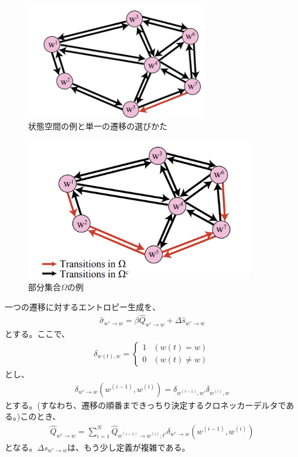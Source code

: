 \documentclass[a4paper,11pt]{jsarticle}
\numberwithin{equation}{section}
\begin{document}
\begin{figure}[H]
    \begin{center}
    \includegraphics[width=80mm]{partial1.png}
    \end{center}
    \caption{状態空間の例と単一の遷移の選びかた}
    \label{fig:状態空間の例と単一の遷移の選びかた}
\end{figure}

\begin{figure}[H]
    \begin{center}
    \includegraphics[width=100mm]{ome.png}
    \end{center}
    \caption{部分集合$\Omega$の例}
    \label{fig:ome}
\end{figure}

一つの遷移に対するエントロピー生成を、
\begin{align}
    \hat{\sigma}_{w' \to w} = \beta \hat{Q}_{w' \to w} + \Delta \hat{s}_{w' \to w}
\end{align}
とする。ここで、
\begin{align}
    \delta_{w(t),w} 
    = \begin{cases}
        1 & (w(t) = w) \\
        0 & (w(t) \neq w)
    \end{cases}
\end{align}
とし、
\begin{align}
    \delta_{w' \to w}(w^{(i-1)}, w^{(i)}) = \delta_{w^{(i-1)}, w'} \delta_{w^{(i)}, w}
\end{align}
とする。(すなわち、遷移の順番まできっちり決定するクロネッカーデルタである。)このとき、
\begin{align}
    \hat{Q}_{w' \to w} = \sum_{i = 1}^{N} \hat{Q}_{w^{(i-1)} \to w^{(i)};t^i}\delta_{w'\to w}(w^{(i-1)}, w^{(i)})
\end{align}
となる。$\Delta s_{w' \to w}$は、もう少し定義が複雑である。\\
\end{document}
